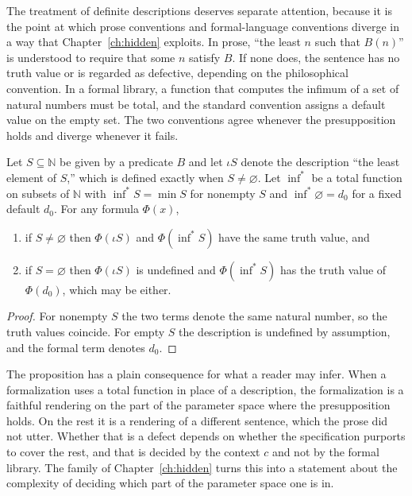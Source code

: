 The treatment of definite descriptions deserves separate attention, because it is the point at which prose conventions and formal-language conventions diverge in a way that Chapter~\ref{ch:hidden} exploits. In prose, ``the least $n$ such that $B(n)$'' is understood to require that some $n$ satisfy $B$. If none does, the sentence has no truth value or is regarded as defective, depending on the philosophical convention. In a formal library, a function that computes the infimum of a set of natural numbers must be total, and the standard convention assigns a default value on the empty set. The two conventions agree whenever the presupposition holds and diverge whenever it fails.

\begin{proposition}
\label{prop:presup}
Let $S \subseteq \mathbb{N}$ be given by a predicate $B$ and let $\iota S$ denote the description ``the least element of $S$,'' which is defined exactly when $S \neq \varnothing$. Let $\inf^{*}$ be a total function on subsets of $\mathbb{N}$ with $\inf^{*}S = \min S$ for nonempty $S$ and $\inf^{*}\varnothing = d_0$ for a fixed default $d_0$. For any formula $\Phi(x)$,
\begin{enumerate}[label=(\roman*)]
\item if $S \neq \varnothing$ then $\Phi(\iota S)$ and $\Phi(\inf^{*}S)$ have the same truth value, and
\item if $S = \varnothing$ then $\Phi(\iota S)$ is undefined and $\Phi(\inf^{*}S)$ has the truth value of $\Phi(d_0)$, which may be either.
\end{enumerate}
\end{proposition}

\begin{proof}
For nonempty $S$ the two terms denote the same natural number, so the truth values coincide. For empty $S$ the description is undefined by assumption, and the formal term denotes $d_0$.
\end{proof}

The proposition has a plain consequence for what a reader may infer. When a formalization uses a total function in place of a description, the formalization is a faithful rendering on the part of the parameter space where the presupposition holds. On the rest it is a rendering of a different sentence, which the prose did not utter. Whether that is a defect depends on whether the specification purports to cover the rest, and that is decided by the context $c$ and not by the formal library. The family of Chapter~\ref{ch:hidden} turns this into a statement about the complexity of deciding which part of the parameter space one is in.

